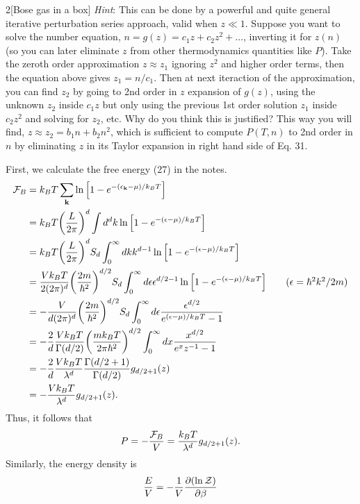 \documentclass[12pt]{article}
\begin{document}
\begin{problem}{2}[Bose gas in a box]
\textit{Hint}: This can be done by a powerful and quite general iterative
perturbation series approach, valid when $z\ll 1$. Suppose you want to solve the
number equation, $n=g(z)=c_1z+c_2z^2+\hdots$, inverting it for $z(n)$ (so you
can later eliminate $z$ from other thermodynamics quantities like $P$). Take the
zeroth order approximation $z\approx z_1$ ignoring $z^2$ and higher order terms,
then the equation above gives $z_1=n/c_1$. Then at next iteraction of the
approximation, you can find $z_2$ by going to 2nd order in $z$ expansion of
$g(z)$, using the unknown $z_2$ inside $c_1z$ but only using the previous 1st
order solution $z_1$ inside $c_2z^2$ and solving for $z_2$, etc. Why do you
think this is justified? This way you will find, $z\approx z_2=b_1n+b_2n^2$,
which is sufficient to compute $P(T,n)$ to 2nd order in $n$ by eliminating $z$
in its Taylor expansion in right hand side of Eq. 31.
\begin{solution}
First, we calculate the free energy (27) in the notes.
\begin{align}
    \mathcal{F}_B&=k_BT\sum_{\vb{k}}\ln\qty[1-e^{-(\epsilon_{\vb{k}}-\mu)/k_BT}]\notag\\
     &=k_BT\qty(\frac{L}{2\pi})^d
     \int d^dk\ln\qty[1-e^{-(\epsilon-\mu)/k_BT}]\notag\\
     &=k_BT\qty(\frac{L}{2\pi})^dS_d\int_0^\infty dk
     k^{d-1}\ln\qty[1-e^{-(\epsilon-\mu)/k_BT}]\notag\\
     &=\frac{Vk_BT}{2(2\pi)^d}\qty(\frac{2m}{\hbar^2})^{d/2}S_d\int_0^\infty
     d\epsilon
     \epsilon^{d/2-1}\ln\qty[1-e^{-(\epsilon-\mu)/k_BT}]\tag{$\epsilon=\hbar^2k^2/2m$}\\
     &=-\frac{V}{d(2\pi)^d}\qty(\frac{2m}{\hbar^2})^{d/2}S_d\int_0^\infty
     d\epsilon\frac{\epsilon^{d/2}}{e^{(\epsilon-\mu)/k_BT}-1}\notag\\
     &=-\frac2d\frac{Vk_BT}{\Gamma(d/2)}\qty(\frac{mk_BT}{2\pi\hbar^2})^{d/2}\int_0^\infty
     dx\frac{x^{d/2}}{e^xz^{-1}-1}\notag\\
     &=-\frac2d\frac{Vk_BT}{\lambda^d}\frac{\Gamma(d/2+1)}{\Gamma(d/2)}g_{d/2+1}(z)\notag\\
     &=-\frac{Vk_BT}{\lambda^d}g_{d/2+1}(z).
\end{align}
Thus, it follows that
\begin{equation}
    P=-\frac{\mathcal{F}_B}{V}
    =\frac{k_BT}{\lambda^d}g_{d/2+1}(z).
\end{equation}
Similarly, the energy density is
\begin{align}
    \frac{E}{V}&=-\frac1V\frac{\partial(\ln\ZZ)}{\partial\beta}\notag\\ 

\end{align}
\end{solution}
\end{problem}
\end{document}
